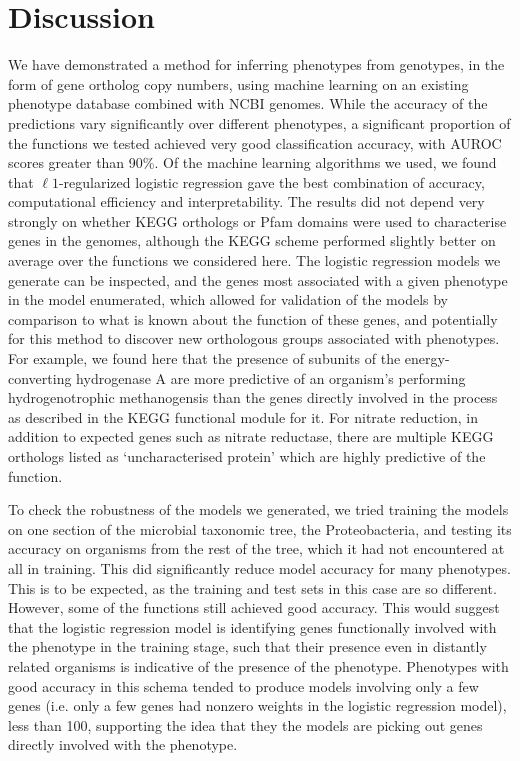 \documentclass[10pt,letterpaper]{article}
\begin{document}
\section*{Discussion}
We have demonstrated a method for inferring phenotypes from genotypes, in the form of gene ortholog copy numbers, using machine learning on an existing phenotype database combined with NCBI genomes. While the accuracy of the predictions vary significantly over different phenotypes, a significant proportion of the functions we tested achieved very good classification accuracy, with AUROC scores greater than 90\%. Of the machine learning algorithms we used, we found that $\ell1$-regularized logistic regression gave the best combination of accuracy, computational efficiency and interpretability.
The results did not depend very strongly on whether KEGG orthologs or Pfam domains were used to characterise genes in the genomes, although the KEGG scheme performed slightly better on average over the functions we considered here. The logistic regression models we generate can be inspected, and the genes most associated with a given phenotype in the model enumerated, which allowed for validation of the models by comparison to what is known about the function of these genes, and potentially for this method to discover new orthologous groups associated with phenotypes. For example, we found here that the presence of subunits of the energy-converting hydrogenase A are more predictive of an organism's performing hydrogenotrophic methanogensis than the genes directly involved in the process as described in the KEGG functional module for it. For nitrate reduction, in addition to expected genes such as nitrate reductase, there are multiple KEGG orthologs listed as `uncharacterised protein' which are highly predictive of the function.

To check the robustness of the models we generated, we tried training the models on one section of the microbial taxonomic tree, the Proteobacteria, and testing its accuracy on organisms from the rest of the tree, which it had not encountered at all in training. This did significantly reduce model accuracy for many phenotypes. This is to be expected, as the training and test sets in this case are so different. However, some of the functions still achieved good accuracy. This would suggest that the logistic regression model is identifying genes functionally involved with the phenotype in the training stage, such that their presence even in distantly related organisms is indicative of the presence of the phenotype. Phenotypes with good accuracy in this schema tended to produce models involving only a few genes (i.e. only a few genes had nonzero weights in the logistic regression model), less than 100, supporting the idea that they the models are picking out genes directly involved with the phenotype. %
\end{document}
